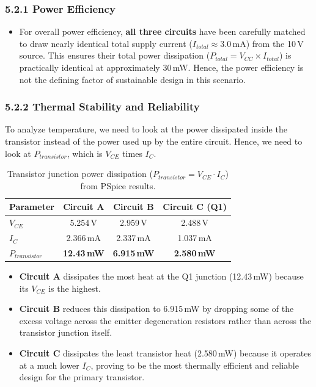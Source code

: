 \documentclass[11pt, a4paper]{article}
\begin{document}
\subsubsection*{5.2.1 Power Efficiency}

\begin{itemize}
    \item For overall power efficiency, \textbf{all three circuits} have been carefully matched to draw nearly identical total supply current ($I_{total} \approx 3.0$\,mA) from the 10\,V source. This ensures their total power dissipation ($P_{total} = V_{CC} \times I_{total}$) is practically identical at approximately 30\,mW. Hence, the power efficiency is not the defining factor of sustainable design in this scenario.
\end{itemize}

\subsubsection*{5.2.2 Thermal Stability and Reliability}

To analyze temperature, we need to look at the power dissipated inside the transistor instead of the power used up by the entire circuit. Hence, we need to look at $P_{transistor}$, which is $V_{CE}$ times $I_C$. 

\begin{table}[H]
    \centering
    \caption{Transistor junction power dissipation ($P_{transistor} = V_{CE} \cdot I_C$) from PSpice results.}
    \renewcommand{\arraystretch}{1.3}
    \begin{tabular}{lccc}
        \toprule
        \textbf{Parameter} & \textbf{Circuit A} & \textbf{Circuit B} & \textbf{Circuit C (Q1)} \\
        \midrule
        $V_{CE}$ & 5.254\,V & 2.959\,V & 2.488\,V \\
        $I_C$    & 2.366\,mA & 2.337\,mA & 1.037\,mA \\
        $P_{transistor}$ & \textbf{12.43\,mW} & \textbf{6.915\,mW} & \textbf{2.580\,mW} \\
        \bottomrule
    \end{tabular}
    \label{tab:power_transistor}
\end{table}

\begin{itemize}
    \item \textbf{Circuit A} dissipates the most heat at the Q1 junction (12.43\,mW) because its $V_{CE}$ is the highest.
    \item \textbf{Circuit B} reduces this dissipation to 6.915\,mW by dropping some of the excess voltage across the emitter degeneration resistors rather than across the transistor junction itself.
    \item \textbf{Circuit C} dissipates the least transistor heat (2.580\,mW) because it operates at a much lower $I_C$, proving to be the most thermally efficient and reliable design for the primary transistor.
\end{itemize}
\end{document}

